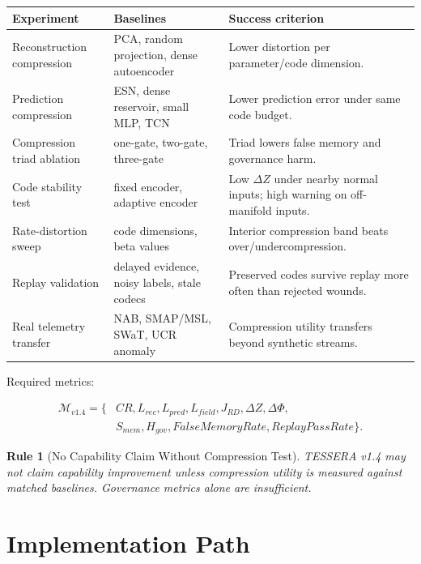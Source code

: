 \documentclass[12pt]{article}
\newtheorem{rulebox}{Rule}
\begin{document}
\begin{longtable}{p{}p{}p{}}
\toprule
\textbf{Experiment} & \textbf{Baselines} & \textbf{Success criterion} \\
\midrule
Reconstruction compression & PCA, random projection, dense autoencoder & Lower distortion per parameter/code dimension. \\
Prediction compression & ESN, dense reservoir, small MLP, TCN & Lower prediction error under same code budget. \\
Compression triad ablation & one-gate, two-gate, three-gate & Triad lowers false memory and governance harm. \\
Code stability test & fixed encoder, adaptive encoder & Low \(\Delta Z\) under nearby normal inputs; high warning on off-manifold inputs. \\
Rate-distortion sweep & code dimensions, beta values & Interior compression band beats over/undercompression. \\
Replay validation & delayed evidence, noisy labels, stale codecs & Preserved codes survive replay more often than rejected wounds. \\
Real telemetry transfer & NAB, SMAP/MSL, SWaT, UCR anomaly & Compression utility transfers beyond synthetic streams. \\
\bottomrule
\end{longtable}

Required metrics:

\[
\begin{aligned}
\mathcal{M}_{v1.4}=\{&CR,L_{rec},L_{pred},L_{field},J_{RD},\Delta Z,\Delta\Phi,\\
&S_{mem},H_{gov},FalseMemoryRate,ReplayPassRate\}.
\end{aligned}
\]

\begin{rulebox}[No Capability Claim Without Compression Test]
TESSERA v1.4 may not claim capability improvement unless compression utility is
measured against matched baselines. Governance metrics alone are insufficient.
\end{rulebox}

\section{Implementation Path}
\end{document}
